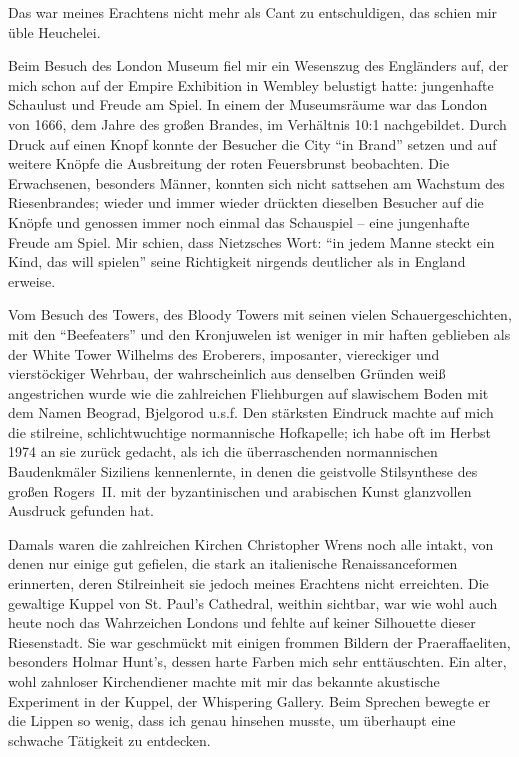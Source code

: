 Das war meines Erachtens nicht mehr als Cant zu entschuldigen, das schien mir üble Heuchelei.

Beim Besuch des London Museum fiel mir ein Wesenszug des Engländers auf, der mich schon auf der Empire Exhibition in Wembley belustigt hatte: jungenhafte Schaulust und Freude am Spiel. In einem der Museumsräume war das London von 1666, dem Jahre des großen Brandes, im Verhältnis 10:1 nachgebildet. Durch Druck auf einen Knopf konnte der Besucher die City \enquote{in Brand} setzen und auf weitere Knöpfe die Ausbreitung der roten Feuersbrunst beobachten. Die Erwachsenen, besonders Männer, konnten sich nicht sattsehen am Wachstum des Riesenbrandes; wieder und immer wieder drückten dieselben Besucher auf die Knöpfe und genossen immer noch einmal das Schauspiel -- eine jungenhafte Freude am Spiel. Mir schien, dass Nietzsches Wort: \enquote{in jedem Manne steckt ein Kind, das will spielen} seine Richtigkeit nirgends deutlicher als in England erweise.

Vom Besuch des Towers, des Bloody Towers mit seinen vielen Schauergeschichten, mit den \enquote{Beefeaters} und den Kronjuwelen ist weniger in mir haften geblieben als der White Tower Wilhelms des Eroberers, imposanter, viereckiger und vierstöckiger Wehrbau, der wahrscheinlich aus denselben Gründen weiß angestrichen wurde wie die zahlreichen Fliehburgen auf slawischem Boden mit dem Namen Beograd, Bjelgorod u.s.f. Den stärksten Eindruck machte auf mich die stilreine, schlichtwuchtige normannische Hofkapelle; ich habe oft im Herbst 1974 an sie zurück gedacht, als ich die überraschenden normannischen Baudenkmäler Siziliens kennenlernte, in denen die geistvolle Stilsynthese des großen Rogers~II. mit der byzantinischen und arabischen Kunst glanzvollen Ausdruck gefunden hat.

Damals waren die zahlreichen Kirchen Christopher Wrens noch alle intakt, von denen nur einige gut gefielen, die stark an italienische Renaissanceformen erinnerten, deren Stilreinheit sie jedoch meines Erachtens nicht erreichten. Die gewaltige Kuppel von St. Paul's Cathedral, weithin sichtbar, war wie wohl auch heute noch das Wahrzeichen Londons und fehlte auf keiner Silhouette dieser Riesenstadt. Sie war geschmückt mit einigen frommen Bildern der Praeraffaeliten, besonders Holmar Hunt's, dessen harte Farben mich sehr enttäuschten. Ein alter, wohl zahnloser Kirchendiener machte mit mir das bekannte akustische Experiment in der Kuppel, der Whispering Gallery. Beim Sprechen bewegte er die Lippen so wenig, dass ich genau hinsehen musste, um überhaupt eine schwache Tätigkeit zu entdecken.

